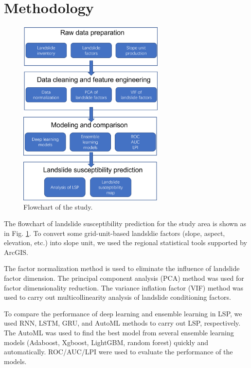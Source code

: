 \documentclass[a4paper,fleqn]{cas-sc}
\begin{document}
\section{Methodology}

\begin{figure}
    \centering
    \includegraphics[width=0.65\textwidth]{figs_rev1/Fig_Workflow.png}
    \caption{Flowchart of the study.}
    \label{fig:Workflow}
\end{figure}

The flowchart of landslide susceptibility prediction for the study area is shown as in Fig. \ref{fig:Workflow}. 
To convert some grid-unit-based landsldie factors (slope, aspect, elevation, etc.) into slope unit, we used the regional statistical tools supported by ArcGIS. 


The factor normalization method is used to eliminate the influence of landslide factor dimension.
The principal component analysis (PCA) method was used for factor dimensionality reduction.
The variance inflation factor (VIF) method was used to carry out multicollinearity analysis of landslide conditioning factors.

To compare the performance of deep learning and ensemble learning in LSP, we used RNN, LSTM, GRU, and AutoML methods to carry out LSP, respectively.
The AutoML was used to find the best model from several ensemble learning models (Adaboost, Xgboost, LightGBM, random forest) quickly and automatically.
ROC/AUC/LPI were used to evaluate the performance of the models.
\end{document}
